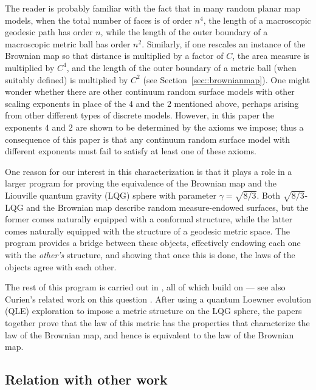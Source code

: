 \documentclass[10pt]{amsart}
\theoremstyle{plain}
\numberwithin{theorem}{section}
\theoremstyle{definition}
\begin{document}
The reader is probably familiar with the fact that in many random planar map models, when the total number of faces is of order $n^4$, the length of a macroscopic geodesic path has order $n$, while the length of the outer boundary of a macroscopic metric ball has order $n^2$. Similarly, if one rescales an instance of the Brownian map so that distance is multiplied by a factor of $C$, the area measure is multiplied by $C^4$, and the length of the outer boundary of a metric ball (when suitably defined) is multiplied by $C^2$ (see Section~\ref{sec::brownianmap}). One might wonder whether there are other continuum random surface models with other scaling exponents in place of the $4$ and the $2$ mentioned above, perhaps arising from other different types of discrete models. However, in this paper the exponents $4$ and $2$ are shown to be determined by the axioms we impose; thus a consequence of this paper is that any continuum random surface model with different exponents must fail to satisfy at least one of these axioms.

One reason for our interest in this characterization is that it plays a role in a larger program for proving the equivalence of the Brownian map and the Liouville quantum gravity (LQG) sphere with parameter $\gamma = \sqrt{8/3}$. Both $\sqrt{8/3}$-LQG and the Brownian map describe random measure-endowed surfaces, but the former comes naturally equipped with a conformal structure, while the latter comes naturally equipped with the structure of a geodesic metric space. The program provides a bridge between these objects, effectively endowing each one with the \emph{other's} structure, and showing that once this is done, the laws of the objects agree with each other.

The rest of this program is carried out in \cite{qlebm,quantum_spheres,qle_continuity, qle_determined}, all of which build on \cite{she2010zipper, ms2012imag1, ms2012imag2, ms2012imag3, ms2013imag4, ms2013qle, matingtrees} --- see also Curien's related work on this question \cite{cur2013glimpse}. After using a quantum Loewner evolution (QLE) exploration to impose a metric structure on the LQG sphere, the papers \cite{qlebm, qle_continuity} together prove that the law of this metric has the properties that characterize the law of the Brownian map, and hence is equivalent to the law of the Brownian map.\enlargethispage{\baselineskip}%

\subsection{Relation with other work}
\end{document}
